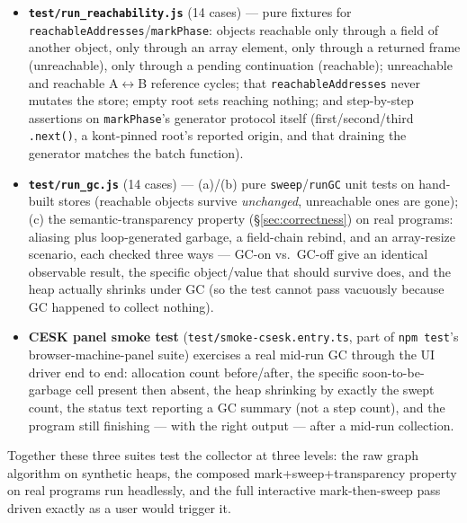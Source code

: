 \documentclass[11pt]{article}
\begin{document}
\begin{itemize}
  \item \textbf{\texttt{test/run\_reachability.js}} (14 cases) --- pure
        fixtures for \texttt{reachableAddresses}/\texttt{markPhase}:
        objects reachable only through a field of another object, only
        through an array element, only through a returned frame
        (unreachable), only through a pending continuation (reachable);
        unreachable and reachable A$\leftrightarrow$B reference cycles;
        that \texttt{reachableAddresses} never mutates the store; empty
        root sets reaching nothing; and step-by-step assertions on
        \texttt{markPhase}'s generator protocol itself (first/second/third
        \texttt{.next()}, a kont-pinned root's reported origin, and that
        draining the generator matches the batch function).
  \item \textbf{\texttt{test/run\_gc.js}} (14 cases) --- (a)/(b) pure
        \texttt{sweep}/\texttt{runGC} unit tests on hand-built stores
        (reachable objects survive \emph{unchanged}, unreachable ones are
        gone); (c) the semantic-transparency property
        (\S\ref{sec:correctness}) on real programs: aliasing plus
        loop-generated garbage, a field-chain rebind, and an array-resize
        scenario, each checked three ways --- GC-on vs.\ GC-off give an
        identical observable result, the specific object/value that
        should survive does, and the heap actually shrinks under GC (so
        the test cannot pass vacuously because GC happened to collect
        nothing).
  \item \textbf{CESK panel smoke test} (\texttt{test/smoke-csesk.entry.ts},
        part of \texttt{npm test}'s browser-machine-panel suite) exercises
        a real mid-run GC through the UI driver end to end: allocation
        count before/after, the specific soon-to-be-garbage cell present
        then absent, the heap shrinking by exactly the swept count, the
        status text reporting a GC summary (not a step count), and the
        program still finishing --- with the right output --- after a
        mid-run collection.
\end{itemize}

Together these three suites test the collector at three levels: the raw
graph algorithm on synthetic heaps, the composed mark+sweep+transparency
property on real programs run headlessly, and the full interactive
mark-then-sweep pass driven exactly as a user would trigger it.

\end{document}
